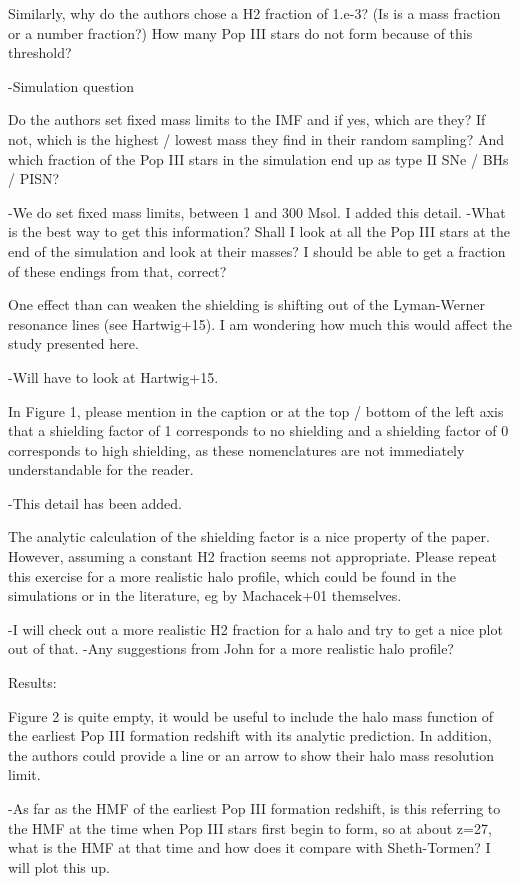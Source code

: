 \documentclass[11pt]{article}
\newenvironment{referee}[1][]{%
    \ignorespaces%
    \begin{mdframed}[style=myquotestyle,#1]%
}{%
    \end{mdframed}%
    \ignorespacesafterend%
}%
\begin{document}
\begin{referee}
Similarly, why do the authors chose a H2 fraction of 1.e-3? (Is is a mass fraction or a number fraction?) How many Pop III stars do not form because of this threshold?
\end{referee}
-Simulation question

\begin{referee}
Do the authors set fixed mass limits to the IMF and if yes, which are they?  If not, which is the highest / lowest mass they find in their random sampling?  And which fraction of the Pop III stars in the simulation end up as type II SNe / BHs / PISN?
\end{referee}
-We do set fixed mass limits, between 1 and 300 Msol. I added this detail. 
-What is the best way to get this information? Shall I look at all the Pop III stars at the end of the simulation and look at their masses? I should be able to get a fraction of these endings from that, correct?

\begin{referee}
One effect than can weaken the shielding is shifting out of the Lyman-Werner resonance lines (see Hartwig+15). I am wondering how much this would affect the study presented here.
\end{referee}
-Will have to look at Hartwig+15. 

\begin{referee}
In Figure 1, please mention in the caption or at the top / bottom of the left axis that a shielding factor of 1 corresponds to no shielding and a shielding factor of 0 corresponds to high shielding, as these nomenclatures are not immediately understandable for the reader.
\end{referee}
-This detail has been added. 

\begin{referee}
The analytic calculation of the shielding factor is a nice property of the paper. However, assuming a constant H2 fraction seems not appropriate. Please repeat this exercise for a more realistic halo profile, which could be found in the simulations or in the literature, eg by Machacek+01 themselves.
\end{referee}
-I will check out a more realistic H2 fraction for a halo and try to get a nice plot out of that.
-Any suggestions from John for a more realistic halo profile?

\begin{referee}
Results:

Figure 2 is quite empty, it would be useful to include the halo mass function of the earliest Pop III formation redshift with its analytic prediction. In addition, the authors could provide a line or an arrow to show their halo mass resolution limit.
\end{referee}
-As far as the HMF of the earliest Pop III formation redshift, is this referring to the HMF at the time when Pop III stars first begin to form, so at about z=27, what is the HMF at that time and how does it compare with Sheth-Tormen? I will plot this up.
\end{document}
